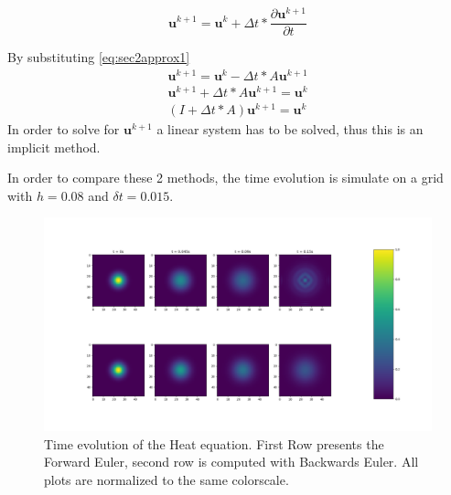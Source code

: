 \documentclass{article}
\begin{document}
\begin{equation}
\mathbf{u}^{k+1} = \mathbf{u}^{k}+\Delta t*\frac{\partial \mathbf{u}^{k+1}}{\partial t}
\end{equation}

By substituting \autoref{eq:sec2approx1}
\begin{align}
\mathbf{u}^{k+1} = \mathbf{u}^{k}-\Delta t*A\mathbf{u}^{k+1}\\
\mathbf{u}^{k+1} + \Delta t*A\mathbf{u}^{k+1}= \mathbf{u}^{k}\\
(I+\Delta t*A)\mathbf{u}^{k+1} = \mathbf{u}^k
\end{align}
In order to solve for $\mathbf{u}^{k+1}$ a linear system has to be solved, thus this is an implicit method.

In order to compare these 2 methods, the time evolution is simulate on a grid with $h=0.08$ and $\delta t = 0.015$. 
\begin{figure}[H]
	\centering
	\includegraphics[width=.9\linewidth]{21.png}
	\caption{Time evolution of the Heat equation. First Row presents the Forward Euler, second row is computed with Backwards Euler. All plots are normalized to the same colorscale.}
\end{figure}
\end{document}
